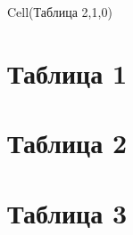 \documentclass[a4paper,11pt]{article}
\begin{document}
Cell(Таблица 2,1,0)
	\section{Таблица 1}
	\section{Таблица 2}

	\section{Таблица 3}
\end{document}
